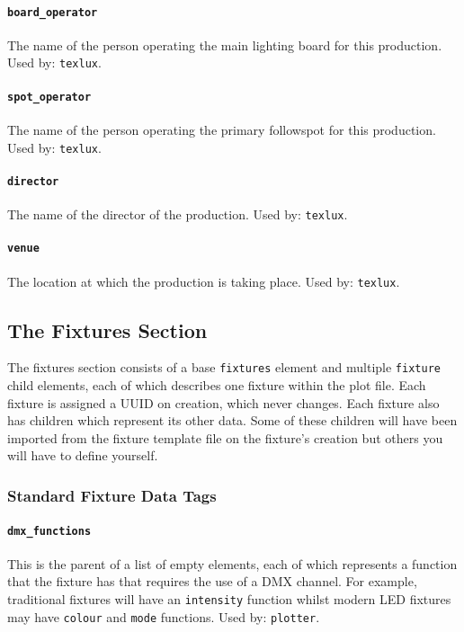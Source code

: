 \documentclass[a4paper]{article}
\begin{document}
\paragraph{\texttt{board\_operator}}
The name of the person operating the main lighting board for this production.
Used by: \texttt{texlux}.

\paragraph{\texttt{spot\_operator}}
The name of the person operating the primary followspot for this production.
Used by: \texttt{texlux}.

\paragraph{\texttt{director}}
The name of the director of the production. Used by: \texttt{texlux}.

\paragraph{\texttt{venue}}
The location at which the production is taking place. Used by: 
\texttt{texlux}.

\subsection{The Fixtures Section}
The fixtures section consists of a base \texttt{fixtures} element and 
multiple \texttt{fixture} child elements, each of which describes one fixture 
within the plot file. Each fixture is assigned a UUID on creation, which 
never changes. Each fixture also has children which represent its other data.
Some of these children will have been imported from the fixture template 
file on the fixture's creation but others you will have to define yourself.

\subsubsection{Standard Fixture Data Tags}

\paragraph{\texttt{dmx\_functions}}
This is the parent of a list of empty elements, each of which represents a 
function that the fixture has that requires the use of a DMX channel. For 
example, traditional fixtures will have an \texttt{intensity} function 
whilst modern LED fixtures may have \texttt{colour} and \texttt{mode} 
functions. Used by: \texttt{plotter}.
\end{document}
